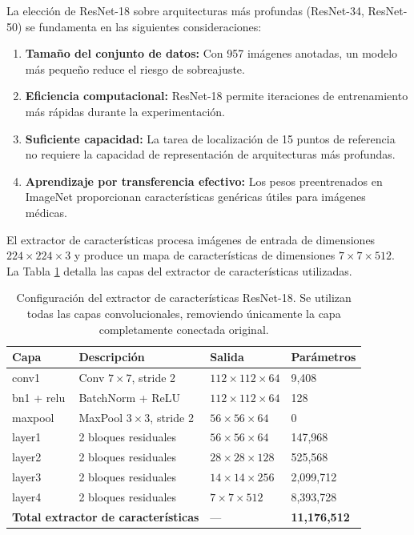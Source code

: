 La elección de ResNet-18 sobre arquitecturas más profundas (ResNet-34, ResNet-50) se fundamenta en las siguientes consideraciones:

\begin{enumerate}
    \item \textbf{Tamaño del conjunto de datos:} Con 957 imágenes anotadas, un modelo más pequeño reduce el riesgo de sobreajuste.
    \item \textbf{Eficiencia computacional:} ResNet-18 permite iteraciones de entrenamiento más rápidas durante la experimentación.
    \item \textbf{Suficiente capacidad:} La tarea de localización de 15 puntos de referencia no requiere la capacidad de representación de arquitecturas más profundas.
    \item \textbf{Aprendizaje por transferencia efectivo:} Los pesos preentrenados en ImageNet proporcionan características genéricas útiles para imágenes médicas.
\end{enumerate}

El extractor de características procesa imágenes de entrada de dimensiones $224 \times 224 \times 3$ y produce un mapa de características de dimensiones $7 \times 7 \times 512$. La Tabla \ref{tab:extractor_caracteristicas_arquitectura} detalla las capas del extractor de características utilizadas.

\begin{table}[htbp]
    \centering
    \caption{Configuración del extractor de características ResNet-18. Se utilizan todas las capas convolucionales, removiendo únicamente la capa completamente conectada original.}
    \label{tab:extractor_caracteristicas_arquitectura}
    \small
    \setlength{\tabcolsep}{3pt}
    \begin{tabular}{@{}p{1.8cm}p{3.5cm}p{3.0cm}p{2.2cm}@{}}
        \toprule
        \textbf{Capa} & \textbf{Descripción} & \textbf{Salida} & \textbf{Parámetros} \\
        \midrule
        conv1 & Conv $7 \times 7$, stride 2 & $112 \times 112 \times 64$ & 9,408 \\
        bn1 + relu & BatchNorm + ReLU & $112 \times 112 \times 64$ & 128 \\
        maxpool & MaxPool $3 \times 3$, stride 2 & $56 \times 56 \times 64$ & 0 \\
        layer1 & 2 bloques residuales & $56 \times 56 \times 64$ & 147,968 \\
        layer2 & 2 bloques residuales & $28 \times 28 \times 128$ & 525,568 \\
        layer3 & 2 bloques residuales & $14 \times 14 \times 256$ & 2,099,712 \\
        layer4 & 2 bloques residuales & $7 \times 7 \times 512$ & 8,393,728 \\
        \midrule
        \multicolumn{2}{l}{\textbf{Total extractor de caracter\'isticas}} & --- & \textbf{11,176,512} \\
        \bottomrule
    \end{tabular}
\end{table}

